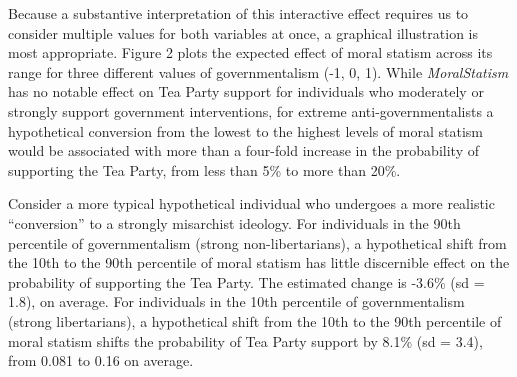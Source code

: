 \documentclass[12pt,]{article}
\begin{document}
Because a substantive interpretation of this interactive effect requires
us to consider multiple values for both variables at once, a graphical
illustration is most appropriate. Figure 2 plots the expected effect of
moral statism across its range for three different values of
governmentalism (-1, 0, 1). While \emph{MoralStatism} has no notable
effect on Tea Party support for individuals who moderately or strongly
support government interventions, for extreme anti-governmentalists a
hypothetical conversion from the lowest to the highest levels of moral
statism would be associated with more than a four-fold increase in the
probability of supporting the Tea Party, from less than 5\% to more than
20\%.

Consider a more typical hypothetical individual who undergoes a more
realistic ``conversion'' to a strongly misarchist ideology. For
individuals in the 90th percentile of governmentalism (strong
non-libertarians), a hypothetical shift from the 10th to the 90th
percentile of moral statism has little discernible effect on the
probability of supporting the Tea Party. The estimated change is -3.6\%
(sd = 1.8), on average. For individuals in the 10th percentile of
governmentalism (strong libertarians), a hypothetical shift from the
10th to the 90th percentile of moral statism shifts the probability of
Tea Party support by 8.1\% (sd = 3.4), from 0.081 to 0.16 on average.
\end{document}
